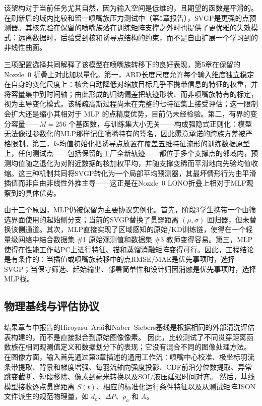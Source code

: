 该架构对于当前任务尤其自然，因为输入空间是低维的，且期望的函数是平滑的。在刷新后的域内比较和留一喷嘴族压力测试中（第5章报告），SVGP是更强的点预测器。其核先验在保留的喷嘴族落在训练矩阵支撑之外时也提供了更优雅的失效模式：远离数据时，后验受到核和诱导点结构的约束，而不是自由扩展一个学习到的非线性曲面。

三项配置选择共同解释了该模型在喷嘴族转移下的良好表现，第5章在保留的 Nozzle~0 折叠上对此加以量化。第一，ARD长度尺度允许每个输入维度独立稳定在自身的变化尺度上：核会自动降低对缩放目标几乎不携带信息的特征的权重，并将容量集中到时间轴；由此形成的归纳偏差把轨迹形状、而非喷嘴族特有的标定，视为主导变化模式。该稀疏高斯过程尚未在完整的七特征集上接受评估；这一限制会扩大还是缩小其相对于 MLP 的点精度优势，目前仍未经检验。第二，有界的变分容量——$M{=}256$ 个基函数，与训练集大小无关——构成强隐式正则化：模型无法像过参数化的MLP那样记住喷嘴特有的签名，因此愿意承诺的跨族方差被严格限制。第三，$k$-均值初始化把诱导点放置在覆盖五维特征流形的训练数据原型上，任何测试点——包括保留的工厂全新轨迹——都位于多个支撑点的邻域内，预测均值随之退化为对附近数据的核加权平均，并随支撑变稀而平滑地向先验均值收缩。这三种机制共同将SVGP转化为一个局部平均预测器，其最坏情形行为由平滑插值而非自由非线性外推主导——这正是在Nozzle~0 LONO折叠上相对于MLP观察到的具体优势。

由于三个原因，MLP仍被保留为主要协议实例化。首先，阶段3学生携带一个由筛选界面使用的起始侧分支；当前的SVGP替换了贯穿距离 $(\mu,\sigma)$ 回归器，但未替换该侧通道。其次，MLP直接实现了区域感知的原始/KD训练链，使得在一个轻量级网络中结合数据集 \#1 原始观测值和数据集 \#3 教师变得容易。第三，MLP使得在性能工作站PC上进行特征、锚和蒸馏消融矩阵变得可行。因此，工程结论是有条件的：当插值或喷嘴族转移中的点RMSE/MAE是优先事项时，选择SVGP；当保守筛选、起始输出、部署简单性和设计归因消融是优先事项时，选择MLP栈。

\subsection{物理基线与评估协议}
\label{sec:baseline-fitting-protocol-en}

结果章节中报告的Hiroyasu--Arai和Naber--Siebers基线是根据相同的外部清洗评估表构建的，而不是直接拟合到原始图像像素。
因此，比较测试了不同贯穿距离函数族在相同观测值定义和数据划分下的表现；它没有混合不同的图像处理方法。
在图像方面，输入首先通过第3章描述的通用工作流：喷嘴中心校准、极坐标羽流条带提取、背景和梯度增强、每羽流轴向强度投影、CDF前沿分位数提取、异常跳变截断、短段移除、像素到毫米转换以及SOI/液压延迟时间对齐。
然后，基线模型接收逐点贯穿距离 $S(t)$、相应的标准化运行条件特征以及从测试矩阵JSON文件派生的规范物理量，如 $d_n$、$\Delta P$、$\rho_a$ 和 $A$。


